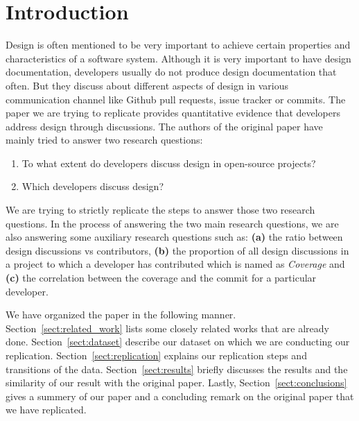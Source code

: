 \section{Introduction}
\label{sect:introduction}
Design is often mentioned to be very important to achieve certain properties and characteristics of a software system. Although it is very important to have design documentation, developers usually do not produce design documentation that often. But they discuss about different aspects of design in various communication channel like Github pull requests, issue tracker or commits. The paper we are trying to replicate provides quantitative evidence that developers address design through discussions. The authors of the original paper have mainly tried to answer two research questions:
\begin{enumerate}
	\item To what extent do developers discuss design in open-source projects?
	\item Which developers discuss design?
\end{enumerate}
We are trying to strictly replicate the steps to answer those two research questions. In the process of answering the two main research questions, we are also answering some auxiliary research questions such as: \noindent\textbf{(a)} the ratio between design discussions vs contributors, \noindent\textbf{(b)} the proportion of all design discussions in a project to which a developer has contributed which is named as \emph{Coverage} and \noindent\textbf{(c)} the correlation between the coverage and the commit for a particular developer.  

We have organized the paper in the following manner. Section~\ref{sect:related_work} lists some closely related works that are already done. Section~\ref{sect:dataset} describe our dataset on which we are conducting our replication. Section~\ref{sect:replication} explains our replication steps and transitions of the data. Section~\ref{sect:results} briefly discusses the results and the similarity of our result with the original paper. Lastly, Section~\ref{sect:conclusions} gives a summery of our paper and a concluding remark on the original paper that we have replicated. 

